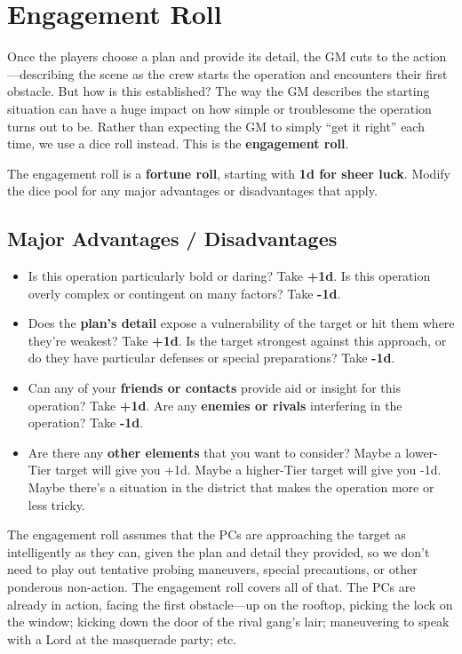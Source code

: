 \documentclass[11pt,fleqn,a5paper]{book}
\begin{document}
\section{Engagement Roll}

Once the players choose a plan and provide its detail, the GM cuts to the action---describing the scene as the crew starts the operation and encounters their first obstacle. But how is this established? The way the GM describes the starting situation can have a huge impact on how simple or troublesome the operation turns out to be. Rather than expecting the GM to simply “get it right” each time, we use a dice roll instead. This is the \textbf{engagement roll}.

The engagement roll is a \textbf{fortune roll}, starting with \textbf{1d for sheer luck}. Modify the dice pool for any major advantages or disadvantages that apply.

\subsection{Major Advantages / Disadvantages}

\begin{itemize}
	\item Is this operation particularly bold or daring? Take \textbf{+1d}. Is this operation overly complex or contingent on many factors? Take \textbf{-1d}.
	\item Does the \textbf{plan’s detail} expose a vulnerability of the target or hit them where they’re weakest? Take \textbf{+1d}. Is the target strongest against this approach, or do they have particular defenses or special preparations? Take \textbf{-1d}.
	\item Can any of your \textbf{friends or contacts }provide aid or insight for this operation? Take \textbf{+1d}. Are any \textbf{enemies or rivals} interfering in the operation? Take \textbf{-1d}.
	\item Are there any \textbf{other elements} that you want to consider? Maybe a lower-Tier target will give you +1d.  Maybe a higher-Tier target will give you -1d. Maybe there’s a situation in the district that makes the operation more or less tricky.
\end{itemize}

The engagement roll assumes that the PCs are approaching the target as intelligently as they can, given the plan and detail they provided, so we don’t need to play out tentative probing maneuvers, special precautions, or other ponderous non-action. The engagement roll covers all of that. The PCs are already in action, facing the first obstacle---up on the rooftop, picking the lock on the window; kicking down the door of the rival gang’s lair; maneuvering to speak with a Lord at the masquerade party; etc.
\end{document}
